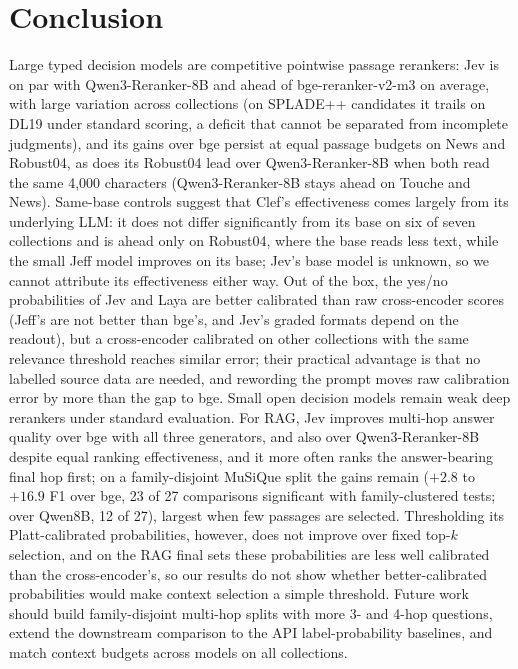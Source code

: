 \section{Conclusion}

Large typed decision models are competitive pointwise passage rerankers: Jev is on par with Qwen3-Reranker-8B and ahead of bge-reranker-v2-m3 on average, with large variation across collections (on SPLADE++ candidates it trails on DL19 under standard scoring, a deficit that cannot be separated from incomplete judgments), and its gains over bge persist at equal passage budgets on News and Robust04, as does its Robust04 lead over Qwen3-Reranker-8B when both read the same 4{,}000 characters (Qwen3-Reranker-8B stays ahead on Touche and News). Same-base controls suggest that Clef's effectiveness comes largely from its underlying LLM: it does not differ significantly from its base on six of seven collections and is ahead only on Robust04, where the base reads less text, while the small Jeff model improves on its base; Jev's base model is unknown, so we cannot attribute its effectiveness either way.
Out of the box, the yes/no probabilities of Jev and Laya are better calibrated than raw cross-encoder scores (Jeff's are not better than bge's, and Jev's graded formats depend on the readout), but a cross-encoder calibrated on other collections with the same relevance threshold reaches similar error; their practical advantage is that no labelled source data are needed, and rewording the prompt moves raw calibration error by more than the gap to bge. Small open decision models remain weak deep rerankers under standard evaluation.
For RAG, Jev improves multi-hop answer quality over bge with all three generators, and also over Qwen3-Reranker-8B despite equal ranking effectiveness, and it more often ranks the answer-bearing final hop first; on a family-disjoint MuSiQue split the gains remain ($+2.8$ to $+16.9$ F1 over bge, 23 of 27 comparisons significant with family-clustered tests; over Qwen8B, 12 of 27), largest when few passages are selected. Thresholding its Platt-calibrated probabilities, however, does not improve over fixed top-$k$ selection, and on the RAG final sets these probabilities are less well calibrated than the cross-encoder's, so our results do not show whether better-calibrated probabilities would make context selection a simple threshold.
Future work should build family-disjoint multi-hop splits with more 3- and 4-hop questions, extend the downstream comparison to the API label-probability baselines, and match context budgets across models on all collections.
